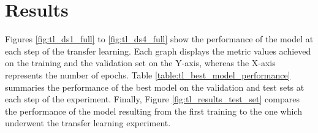 \section{Results}

%
%
%


\setlength{\marginparwidth}{3cm}\leavevmode {}Figures \ref{fig:tl_ds1_full} to \ref{fig:tl_ds4_full} show the performance of the model at each step of the transfer learning. Each graph displays the metric values achieved on the training and the validation set on the Y-axis, whereas the X-axis represents the number of epochs.
Table \ref{table:tl_best_model_performance} summaries the performance of the best model on the validation and test sets at each step of the experiment. 
Finally, Figure \ref{fig:tl_results_test_set} compares the performance of the model resulting from the first training to the one which underwent the transfer learning experiment. 

